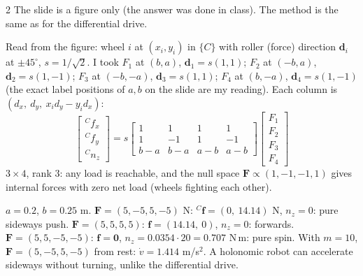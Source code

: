 \begin{multicols}{2}
The slide is a figure only (the answer was done in class). The method is the same as for the differential drive.
\begin{deriv}
Read from the figure: wheel $i$ at $(x_i,y_i)$ in $\{C\}$ with roller (force) direction $\mathbf d_i$ at $\pm45^\circ$, $s=1/\sqrt2$. I took $F_1$ at $(b,a)$, $\mathbf d_1=s(1,1)$; $F_2$ at $(-b,a)$, $\mathbf d_2=s(1,-1)$; $F_3$ at $(-b,-a)$, $\mathbf d_3=s(1,1)$; $F_4$ at $(b,-a)$, $\mathbf d_4=s(1,-1)$ (the exact label positions of $a,b$ on the slide are my reading). Each column is $(d_x,\ d_y,\ x_id_y-y_id_x)$:
\[\begin{bmatrix}{}^Cf_x\\{}^Cf_y\\{}^Cn_z\end{bmatrix}=s\begin{bmatrix}1&1&1&1\\1&-1&1&-1\\b-a&b-a&a-b&a-b\end{bmatrix}\begin{bmatrix}F_1\\F_2\\F_3\\F_4\end{bmatrix}\]
$3\times4$, rank $3$: any load is reachable, and the null space $\mathbf F\propto(1,-1,-1,1)$ gives internal forces with zero net load (wheels fighting each other).
\end{deriv}
\begin{worked}
$a=0.2$, $b=0.25$ m. $\mathbf F=(5,-5,5,-5)$ N: ${}^C\mathbf f=(0,\ 14.14)$ N, $n_z=0$: pure sideways push. $\mathbf F=(5,5,5,5)$: $\mathbf f=(14.14,\ 0)$, $n_z=0$: forwards. $\mathbf F=(5,5,-5,-5)$: $\mathbf f=\mathbf 0$, $n_z=0.0354\cdot20=0.707$ N\,m: pure spin. With $m=10$, $\mathbf F=(5,-5,5,-5)$ from rest: $\dot v=1.414$ m/s$^2$. A holonomic robot can accelerate sideways without turning, unlike the differential drive. \chk
\end{worked}


\end{multicols}
